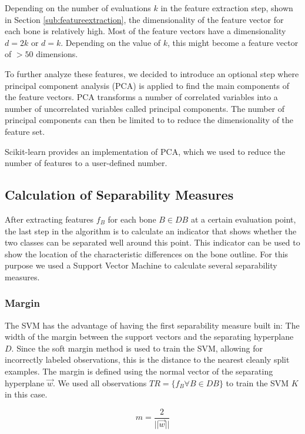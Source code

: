 \documentclass[pdftex,12pt,a4paper]{report}
\begin{document}
Depending on the number of evaluations $k$ in the feature extraction step, shown in Section
\ref{sub:featureextraction}, the dimensionality of the feature vector for each bone is relatively high. Most of 
the feature vectors have a dimensionality $d = 2k$ or $d = k$. Depending on the value of $k$, this might become
a feature vector of $> 50$ dimensions.

To further analyze these features, we decided to introduce an optional step where principal component analysis
(PCA) is applied to find the main components of the feature vectors. PCA transforms a number of correlated variables into a number of uncorrelated variables called principal components. The number of principal components can then be limited to to reduce the dimensionality of the feature set.

Scikit-learn \cite{pedregosa2011scikit} provides an implementation of PCA, which we used to reduce the number of features to a user-defined number.

\subsection{Calculation of Separability Measures}

After extracting features $f_B$ for each bone $B \in DB$ at a certain evaluation point, the last step in the
algorithm is to calculate an indicator that shows whether the two classes can be separated well around this point.
This indicator can be used to show the location of the characteristic differences on the bone outline. For this
purpose we used a Support Vector Machine to calculate several separability measures.

\subsubsection{Margin}

The SVM has the advantage of having the first separability measure built in: The width of the margin between the
support vectors and the separating hyperplane $D$. Since the soft margin method is used to train the SVM, allowing for incorrectly labeled observations, this is the distance to the nearest cleanly split examples. The margin is 
defined using the normal vector of the separating hyperplane $\vec{w}$. We used all observations $TR = \{ f_B \forall B \in DB \}$ to train the SVM $K$ in this case.

\begin{equation}
m = \frac{2}{||\vec{w}||}
\end{equation}
\end{document}
